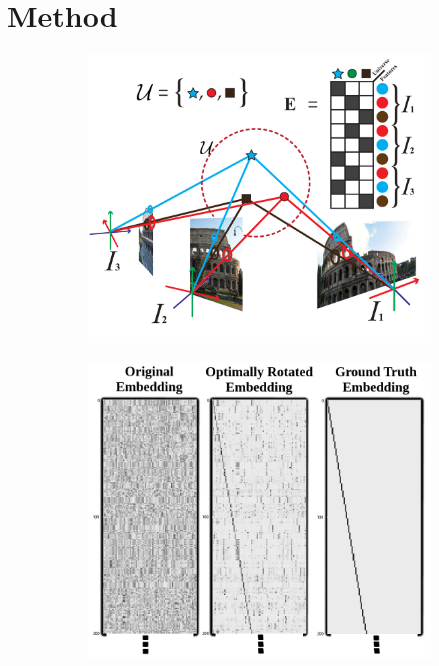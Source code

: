 \documentclass{article} %
\begin{document}
\section{Method}

\begin{figure}[t]
\begin{subfigure}[b]{.45\linewidth}
  \centering
  \includegraphics[width=0.95\linewidth]{figures-UniverseOfFeatures-v2.pdf}
  \caption{}
  \label{fig:1a}
  \label{fig:universefeatures}
\end{subfigure}%
\begin{subfigure}[b]{.55\linewidth}
  \centering
  \includegraphics[width=0.75\linewidth]{figures-EmbeddingsViz.png}
  \caption{}
  \label{fig:1b}

\end{subfigure}
\end{figure}
\end{document}
